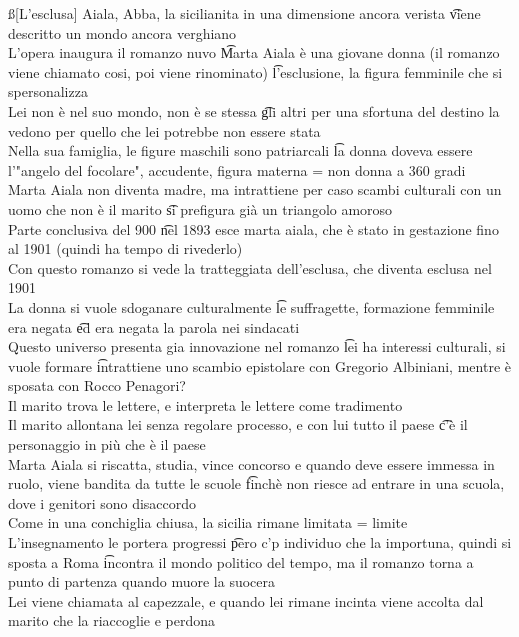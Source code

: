 \documentclass[12pt]{article}
\begin{document}
\ss[L'esclusa]
Aiala, Abba, la sicilianita in una dimensione ancora verista \t viene descritto un mondo ancora verghiano \\
L'opera inaugura il romanzo nuvo \t Marta Aiala è una giovane donna (il romanzo viene chiamato cosi, poi viene rinominato) \t l'esclusione, la figura femminile che si spersonalizza \\
Lei non è nel suo mondo, non è se stessa \t gli altri per una sfortuna del destino la vedono per quello che lei potrebbe non essere stata \\
Nella sua famiglia, le figure maschili sono patriarcali \t la donna doveva essere l'"angelo del focolare", accudente, figura materna = non donna a 360 gradi \\
Marta Aiala non diventa madre, ma intrattiene per caso scambi culturali con un uomo che non è il marito \t si prefigura già un triangolo amoroso \\
Parte conclusiva del 900 \t nel 1893 esce marta aiala, che è stato in gestazione fino al 1901 (quindi ha tempo di rivederlo) \\
Con questo romanzo si vede la tratteggiata dell'esclusa, che diventa esclusa nel 1901 \\
La donna si vuole sdoganare culturalmente \t le suffragette, formazione femminile era negata \t ed era negata la parola nei sindacati \\
Questo universo presenta gia innovazione nel romanzo \t lei ha interessi culturali, si vuole formare \t intrattiene uno scambio epistolare con Gregorio Albiniani, mentre è sposata con Rocco Penagori? \\
Il marito trova le lettere, e interpreta le lettere come tradimento \\
Il marito allontana lei senza regolare processo, e con lui tutto il paese \t c'è il personaggio in più che è il paese \\
Marta Aiala si riscatta, studia, vince concorso e quando deve essere immessa in ruolo, viene bandita da tutte le scuole \t finchè non riesce ad entrare in una scuola, dove i genitori sono disaccordo \\
Come in una conchiglia chiusa, la sicilia rimane limitata = limite \\
L'insegnamento le portera progressi \t pero c'p individuo che la importuna, quindi si sposta a Roma \t incontra il mondo politico del tempo, ma il romanzo torna a punto di partenza quando muore la suocera \\
Lei viene chiamata al capezzale, e quando lei rimane incinta viene accolta dal marito che la riaccoglie e perdona
\end{document}
